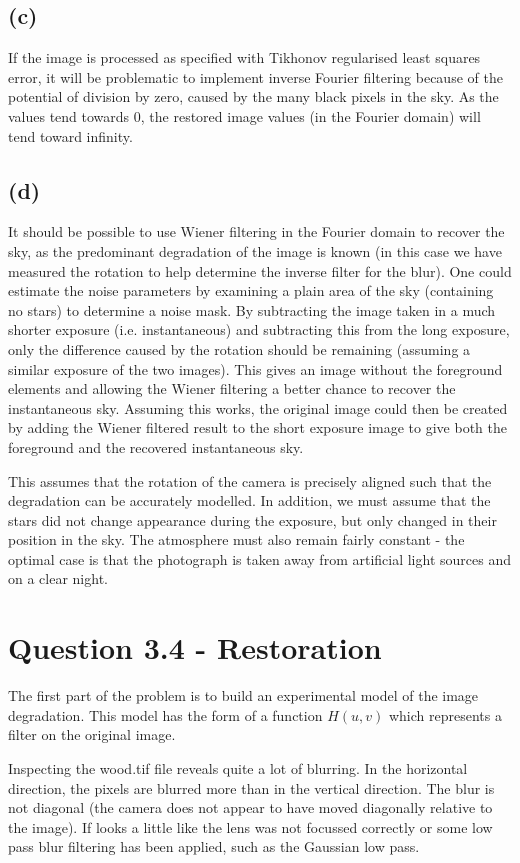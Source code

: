 \documentclass{article}
\begin{document}
	
\subsection*{(c)}
If the image is processed as specified with Tikhonov regularised least squares error, it will be problematic to implement inverse Fourier filtering because of the potential of division by zero, caused by the many black pixels in the sky. As the values tend towards 0, the restored image values (in the Fourier domain) will tend toward infinity.

\subsection*{(d)}
It should be possible to use Wiener filtering in the Fourier domain to recover the sky, as the predominant degradation of the image is known (in this case we have measured the rotation to help determine the inverse filter for the blur). One could estimate the noise parameters by examining a plain area of the sky (containing no stars) to determine a noise mask. By subtracting the image taken in a much shorter exposure (i.e. instantaneous) and subtracting this from the long exposure, only the difference caused by the rotation should be remaining (assuming a similar exposure of the two images). This gives an image without the foreground elements and allowing the Wiener filtering a better chance to recover the instantaneous sky. Assuming this works, the original image could then be created by adding the Wiener filtered result to the short exposure image to give both the foreground and the recovered instantaneous sky.

This assumes that the rotation of the camera is precisely aligned such that the degradation can be accurately modelled. In addition, we must assume that the stars did not change appearance during the exposure, but only changed in their position in the sky. The atmosphere must also remain fairly constant - the optimal case is that the photograph is taken away from artificial light sources and on a clear night.

\section*{Question 3.4 - Restoration}
The first part of the problem is to build an experimental model of the image degradation. This model has the form of a function $H(u,v)$ which represents a filter on the original image.

Inspecting the wood.tif file reveals quite a lot of blurring.  In the horizontal direction, the pixels are blurred more than in the vertical direction. The blur is not diagonal (the camera does not appear to have moved diagonally relative to the image). If looks a little like the lens was not focussed correctly or some low pass blur filtering has been applied, such as the Gaussian low pass. 
\end{document}
